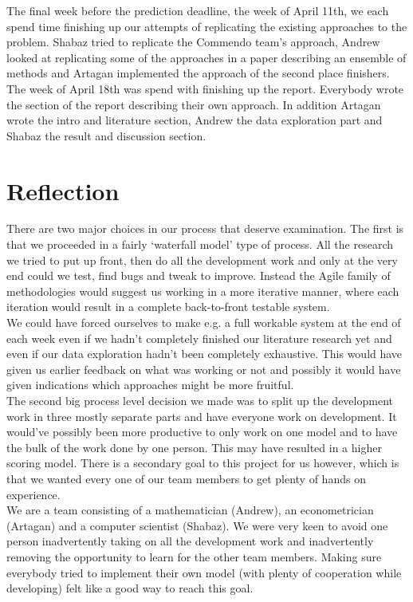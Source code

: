 \documentclass{llncs}
\begin{document}
The final week before the prediction deadline, the week of April 11th, we each spend time finishing up our attempts of replicating the existing approaches to the problem. Shabaz tried to replicate the Commendo team's approach\cite{Jahrer2013}, Andrew looked at replicating some of the approaches in a paper describing an ensemble of methods\cite{Liu2013} and Artagan implemented the approach of the second place finishers\cite{Wang2013}.\\
The week of April 18th was spend with finishing up the report. Everybody wrote the section of the report describing their own approach. In addition Artagan wrote the intro and literature section, Andrew the data exploration part and Shabaz the result and discussion section.
\section{Reflection}
There are two major choices in our process that deserve examination. The first is that we proceeded in a fairly `waterfall model' type of process. All the research we tried to put up front, then do all the development work and only at the very end could we test, find bugs and tweak to improve. Instead the Agile family of methodologies would suggest us working in a more iterative manner, where each iteration would result in a complete back-to-front testable system.\\
We could have forced ourselves to make e.g. a full workable system at the end of each week even if we hadn't completely finished our literature research yet and even if our data exploration hadn't been completely exhaustive. This would have given us earlier feedback on what was working or not and possibly it would have given indications which approaches might be more fruitful.\\
The second big process level decision we made was to split up the development work in three mostly separate parts and have everyone work on development. It would've possibly been more productive to only work on one model and to have the bulk of the work done by one person. This may have resulted in a higher scoring model. There is a secondary goal to this project for us however, which is that we wanted every one of our team members to get plenty of hands on experience.\\
We are a team consisting of a mathematician (Andrew), an econometrician (Artagan) and a computer scientist (Shabaz). We were very keen to avoid one person inadvertently taking on all the development work and inadvertently removing the opportunity to learn for the other team members. Making sure everybody tried to implement their own model (with plenty of cooperation while developing) felt like a good way to reach this goal.


\end{document}
